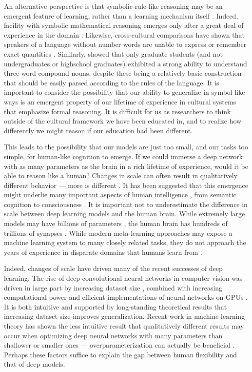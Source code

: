 An alternative perspective is that symbolic-rule-like reasoning may be an emergent feature of learning, rather than a learning mechanism itself \citep{McClelland1999, McClelland2002, McClelland2010a}. Indeed, facility with symbolic mathematical reasoning emerges only after a great deal of experience in the domain \citep{Burger1986, McClelland2016}. Likewise, cross-cultural comparisons have shown that speakers of a language without number words are unable to express or remember exact quantities \citep{Frank2008}. Similarly, \citet{Gleitman1970} showed that only graduate students (and not undergraduates or highschool graduates) exhibited a strong ability to understand three-word compound nouns, despite these being a relatively basic construction that should be easily parsed according to the rules of the language. It is important to consider the possibility that our ability to generalize in symbol-like ways is an emergent property of our lifetime of experience in cultural systems that emphasize formal reasoning. It is difficult for us as researchers to think outside of the cultural framework we have been educated in, and to realize how differently we might reason if our education had been different. \par 
This leads to the possibility that our models are just too small, and our tasks too simple, for human-like cognition to emerge. If we could immerse a deep network with as many parameters as the brain in a rich lifetime of experience, would it be able to reason like a human? Changes in scale can often result in qualitatively different behavior --- more is different \citep{Anderson1972}. It has been suggested that this emergence might underlie many important aspects of human intelligence \citep{McClelland2010a}, from semantic cognition \citep{Rogers2008, Saxe2019} to consciousness \citep{Chalmers2006}. It is important not to underestimate the difference in scale between deep learning models and the human brain. While extremely large models may have billions of parameters \citep[][e.g.]{Radford2019}, the human brain has hundreds of trillions of synapses \citep{Drachman2005}. While modern meta-learning approaches may expose a machine learning system to many closely related tasks, they do not approach the years of experience in disparate domains that humans learn from \citep{Mitchell2018}.\par 
Indeed, changes of scale have driven many of the recent successes of deep learning. The rise of deep convolutional neural networks in computer vision was driven in large part by increasing dataset size \citep{Deng2009}, combined with increasing computational power and efficient implementations of neural networks on GPUs \citep{Krizhevsky2012}. It is both intuitive and supported by long-standing theoretical results \citep{Bartlett2002} that increasing dataset size improves generalization. Recent work in machine-learning theory has shown the less intuitive result that qualitatively different results may occur when optimizing deep neural networks with many parameters than shallower or smaller ones --- overparameterization can actually be beneficial \citep{Dauphin2014, Arora2018a}. Perhaps these factors suffice to explain the gap between human flexibility and that of deep models.\par 
